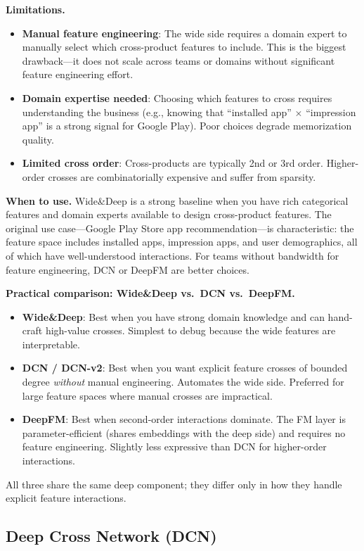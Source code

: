 \textbf{Limitations.}
\begin{itemize}
    \item \textbf{Manual feature engineering}: The wide side requires a domain expert to manually select which cross-product features to include. This is the biggest drawback---it does not scale across teams or domains without significant feature engineering effort.
    \item \textbf{Domain expertise needed}: Choosing which features to cross requires understanding the business (e.g., knowing that ``installed app'' $\times$ ``impression app'' is a strong signal for Google Play). Poor choices degrade memorization quality.
    \item \textbf{Limited cross order}: Cross-products are typically 2nd or 3rd order. Higher-order crosses are combinatorially expensive and suffer from sparsity.
\end{itemize}

\textbf{When to use.} Wide\&Deep is a strong baseline when you have rich categorical features and domain experts available to design cross-product features. The original use case---Google Play Store app recommendation---is characteristic: the feature space includes installed apps, impression apps, and user demographics, all of which have well-understood interactions. For teams without bandwidth for feature engineering, DCN or DeepFM are better choices.

\textbf{Practical comparison: Wide\&Deep vs.\ DCN vs.\ DeepFM.}
\begin{itemize}
    \item \textbf{Wide\&Deep}: Best when you have strong domain knowledge and can hand-craft high-value crosses. Simplest to debug because the wide features are interpretable.
    \item \textbf{DCN / DCN-v2}: Best when you want explicit feature crosses of bounded degree \textit{without} manual engineering. Automates the wide side. Preferred for large feature spaces where manual crosses are impractical.
    \item \textbf{DeepFM}: Best when second-order interactions dominate. The FM layer is parameter-efficient (shares embeddings with the deep side) and requires no feature engineering. Slightly less expressive than DCN for higher-order interactions.
\end{itemize}
All three share the same deep component; they differ only in how they handle explicit feature interactions.

\subsection{Deep Cross Network (DCN)}
\label{sr:sec:dcn}

